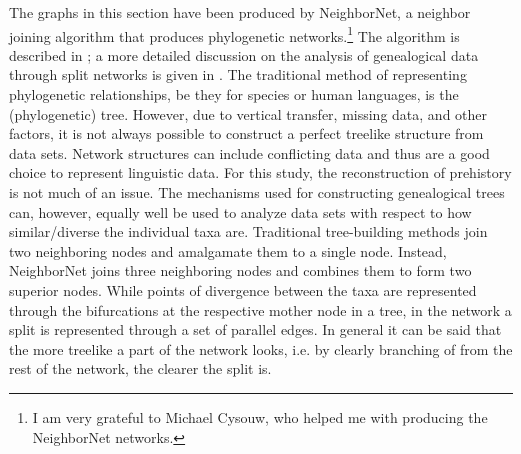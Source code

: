 The graphs in this section have been produced by NeighborNet, a neighbor joining algorithm that produces phylogenetic networks.\footnote{I am very grateful to Michael Cysouw, who helped me with producing the NeighborNet networks.} 
The algorithm is described in \citet{NeighborNet}; a more detailed discussion on the analysis of genealogical data through split networks is given in \citet{NeighborNetApplication}.  
The traditional method of representing phylogenetic relationships, be they for species or human languages, is the (phylogenetic) tree.
However, due to vertical transfer, missing data, and other factors, it is not always possible to construct a perfect treelike structure from data sets.
Network structures can include conflicting data and thus are a good choice to represent linguistic data.
For this study, the reconstruction of prehistory is not much of an issue.
The mechanisms used for constructing genealogical trees can, however, equally well be used to analyze data sets with respect to how similar/diverse the individual taxa are.  
Traditional tree-building methods join two neighboring nodes and amalgamate them to a single node.
Instead, NeighborNet joins three neighboring nodes and combines them to form two superior nodes.
While points of divergence between the taxa are represented through the bifurcations at the respective mother node in a tree, in the network a split is represented through a set of parallel edges. 
In general it can be said that the more treelike a part of the network looks, i.e. by clearly branching of from the rest of the network, the clearer the split is.  


